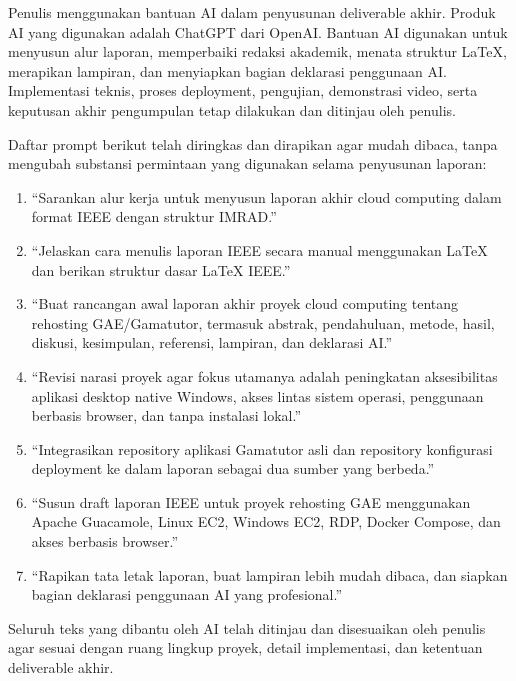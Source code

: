 \documentclass[conference]{IEEEtran}
\begin{document}
Penulis menggunakan bantuan AI dalam penyusunan deliverable akhir. Produk AI yang digunakan adalah ChatGPT dari OpenAI. Bantuan AI digunakan untuk menyusun alur laporan, memperbaiki redaksi akademik, menata struktur LaTeX, merapikan lampiran, dan menyiapkan bagian deklarasi penggunaan AI. Implementasi teknis, proses deployment, pengujian, demonstrasi video, serta keputusan akhir pengumpulan tetap dilakukan dan ditinjau oleh penulis.

Daftar prompt berikut telah diringkas dan dirapikan agar mudah dibaca, tanpa mengubah substansi permintaan yang digunakan selama penyusunan laporan:

\begin{enumerate}
    \item ``Sarankan alur kerja untuk menyusun laporan akhir cloud computing dalam format IEEE dengan struktur IMRAD.''
    \item ``Jelaskan cara menulis laporan IEEE secara manual menggunakan LaTeX dan berikan struktur dasar LaTeX IEEE.''
    \item ``Buat rancangan awal laporan akhir proyek cloud computing tentang rehosting GAE/Gamatutor, termasuk abstrak, pendahuluan, metode, hasil, diskusi, kesimpulan, referensi, lampiran, dan deklarasi AI.''
    \item ``Revisi narasi proyek agar fokus utamanya adalah peningkatan aksesibilitas aplikasi desktop native Windows, akses lintas sistem operasi, penggunaan berbasis browser, dan tanpa instalasi lokal.''
    \item ``Integrasikan repository aplikasi Gamatutor asli dan repository konfigurasi deployment ke dalam laporan sebagai dua sumber yang berbeda.''
    \item ``Susun draft laporan IEEE untuk proyek rehosting GAE menggunakan Apache Guacamole, Linux EC2, Windows EC2, RDP, Docker Compose, dan akses berbasis browser.''
    \item ``Rapikan tata letak laporan, buat lampiran lebih mudah dibaca, dan siapkan bagian deklarasi penggunaan AI yang profesional.''
\end{enumerate}

Seluruh teks yang dibantu oleh AI telah ditinjau dan disesuaikan oleh penulis agar sesuai dengan ruang lingkup proyek, detail implementasi, dan ketentuan deliverable akhir.
\end{document}
